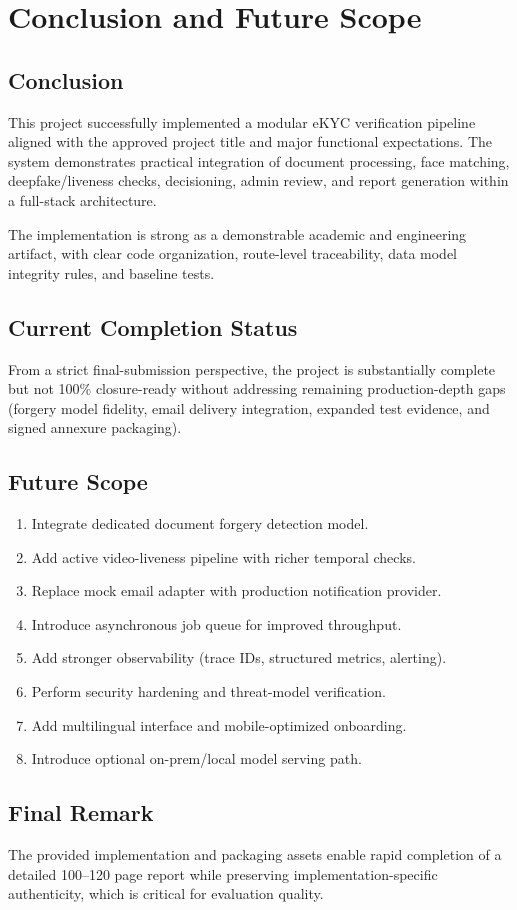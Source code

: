 \chapter{Conclusion and Future Scope}

\section{Conclusion}
This project successfully implemented a modular eKYC verification pipeline aligned with the approved project title and major functional expectations. The system demonstrates practical integration of document processing, face matching, deepfake/liveness checks, decisioning, admin review, and report generation within a full-stack architecture.

The implementation is strong as a demonstrable academic and engineering artifact, with clear code organization, route-level traceability, data model integrity rules, and baseline tests.

\section{Current Completion Status}
From a strict final-submission perspective, the project is substantially complete but not 100\% closure-ready without addressing remaining production-depth gaps (forgery model fidelity, email delivery integration, expanded test evidence, and signed annexure packaging).

\section{Future Scope}
\begin{enumerate}
\item Integrate dedicated document forgery detection model.
\item Add active video-liveness pipeline with richer temporal checks.
\item Replace mock email adapter with production notification provider.
\item Introduce asynchronous job queue for improved throughput.
\item Add stronger observability (trace IDs, structured metrics, alerting).
\item Perform security hardening and threat-model verification.
\item Add multilingual interface and mobile-optimized onboarding.
\item Introduce optional on-prem/local model serving path.
\end{enumerate}

\section{Final Remark}
The provided implementation and packaging assets enable rapid completion of a detailed 100--120 page report while preserving implementation-specific authenticity, which is critical for evaluation quality.
